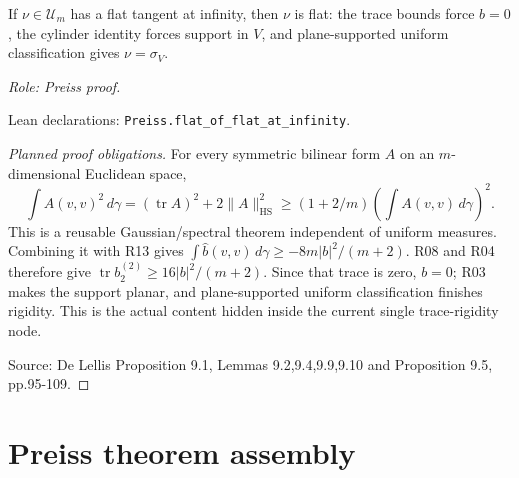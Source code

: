 \begin{theorem}
\label{thm:infinity-rigidity}







If $\nu\in\mathcal U_m$ has a flat tangent at infinity, then $\nu$ is flat: the trace bounds force $b=0$, the cylinder identity forces support in $V$, and plane-supported uniform classification gives $\nu=\sigma_V$.
\par\emph{Role: Preiss proof.}
\par Lean declarations: \texttt{Preiss.flat\_of\_flat\_at\_infinity}.
\end{theorem}
\begin{proof}[Planned proof obligations]

For every symmetric bilinear form $A$ on an $m$-dimensional Euclidean space,
\[
 \int A(v,v)^2\,d\gamma=(\operatorname{tr}A)^2+
 2\|A\|_{\mathrm{HS}}^2
 \geq(1+2/m)\left(\int A(v,v)\,d\gamma\right)^2.
\]
This is a reusable Gaussian/spectral theorem independent of uniform measures.
Combining it with R13 gives
$\int\widehat b(v,v)\,d\gamma\geq-8m|b|^2/(m+2)$.
R08 and R04 therefore give
$\operatorname{tr}b_2^{(2)}\geq16|b|^2/(m+2)$.
Since that trace is zero, $b=0$; R03 makes the support planar, and plane-supported
uniform classification finishes rigidity. This is the actual content hidden
inside the current single trace-rigidity node.
\par Source: De Lellis Proposition 9.1, Lemmas 9.2,9.4,9.9,9.10 and Proposition 9.5, pp.95-109.
\end{proof}

\section{Preiss theorem assembly}


